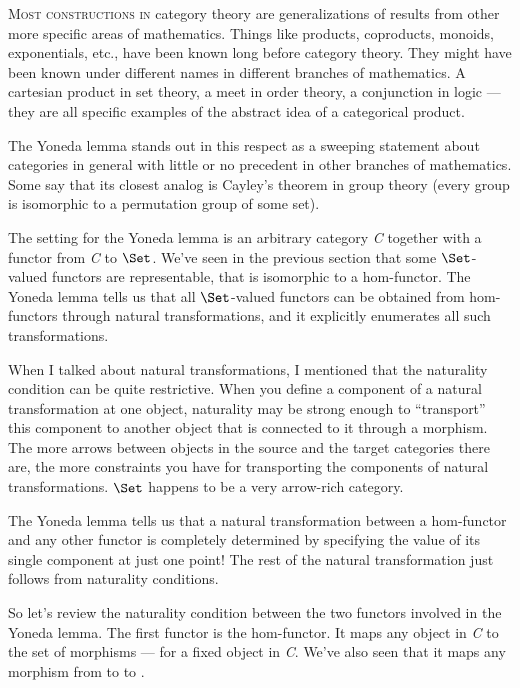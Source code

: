\lettrine[lhang=0.17]{M}{ost constructions in} category theory are generalizations of results
from other more specific areas of mathematics. Things like products,
coproducts, monoids, exponentials, etc., have been known long before
category theory. They might have been known under different names in
different branches of mathematics. A cartesian product in set theory, a
meet in order theory, a conjunction in logic --- they are all specific
examples of the abstract idea of a categorical product.

The Yoneda lemma stands out in this respect as a sweeping statement
about categories in general with little or no precedent in other
branches of mathematics. Some say that its closest analog is Cayley's
theorem in group theory (every group is isomorphic to a permutation
group of some set).

The setting for the Yoneda lemma is an arbitrary category \emph{C}
together with a functor  from \emph{C} to $\Set$. We've
seen in the previous section that some $\Set$-valued functors are
representable, that is isomorphic to a hom-functor. The Yoneda lemma
tells us that all $\Set$-valued functors can be obtained from
hom-functors through natural transformations, and it explicitly
enumerates all such transformations.

When I talked about natural transformations, I mentioned that the
naturality condition can be quite restrictive. When you define a
component of a natural transformation at one object, naturality may be
strong enough to ``transport'' this component to another object that is
connected to it through a morphism. The more arrows between objects in
the source and the target categories there are, the more constraints you
have for transporting the components of natural transformations.
$\Set$ happens to be a very arrow-rich category.

The Yoneda lemma tells us that a natural transformation between a
hom-functor and any other functor  is completely determined by
specifying the value of its single component at just one point! The rest
of the natural transformation just follows from naturality conditions.

So let's review the naturality condition between the two functors
involved in the Yoneda lemma. The first functor is the hom-functor. It
maps any object  in \emph{C} to the set of morphisms
 --- for  a fixed object in \emph{C}. We've
also seen that it maps any morphism  from  to
 to .


